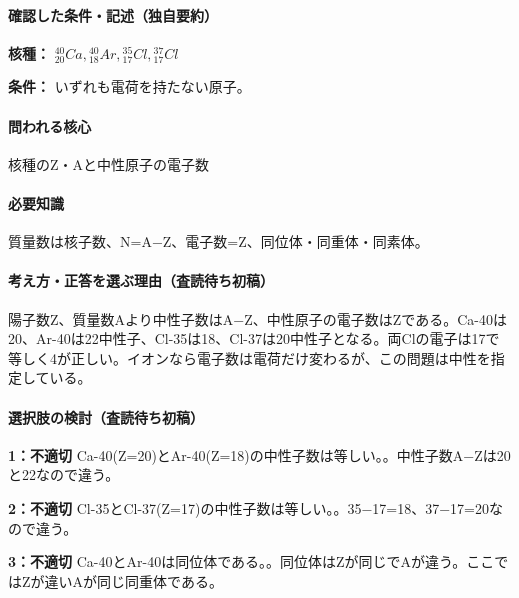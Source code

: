 \paragraph{確認した条件・記述（独自要約）}\mbox{}\par

\noindent\textbf{核種：} \({}^{40}_{20}Ca,{}^{40}_{18}Ar,{}^{35}_{17}Cl,{}^{37}_{17}Cl\)\par

\noindent\textbf{条件：} いずれも電荷を持たない原子。\par

\paragraph{問われる核心} 核種のZ・Aと中性原子の電子数

\paragraph{必要知識} 質量数は核子数、N=\allowbreak{}A−Z、電子数=Z、同位体・同重体・同素体。

\paragraph{考え方・正答を選ぶ理由（査読待ち初稿）} 陽子数Z、質量数Aより中性子数はA−Z、中性原子の電子数はZである。Ca-40は20、Ar-40は22中性子、Cl-35は18、Cl-37は20中性子となる。両Clの電子は17で等しく4が正しい。イオンなら電子数は電荷だけ変わるが、この問題は中性を指定している。

\paragraph{選択肢の検討（査読待ち初稿）}\mbox{}\par

\noindent\textbf{1：不適切} Ca-40(Z=\allowbreak{}20)とAr-40(Z=\allowbreak{}18)の中性子数は等しい。。中性子数A−Zは20と22なので違う。\par

\noindent\textbf{2：不適切} Cl-35とCl-37(Z=\allowbreak{}17)の中性子数は等しい。。35−17=\allowbreak{}18、37−17=\allowbreak{}20なので違う。\par

\noindent\textbf{3：不適切} Ca-40とAr-40は同位体である。。同位体はZが同じでAが違う。ここではZが違いAが同じ同重体である。\par

